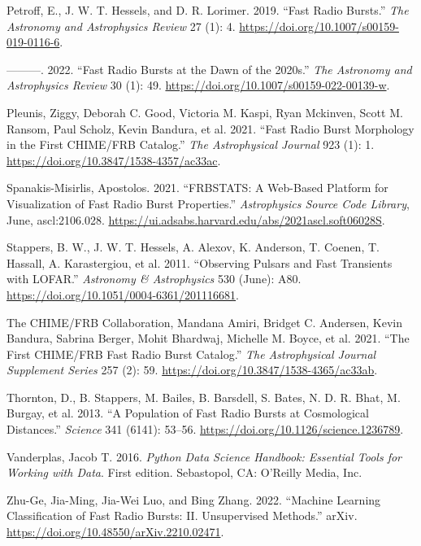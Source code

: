 \documentclass[
  letterpaper,
  DIV=11,
  numbers=noendperiod]{scrreport}
\newlength{\cslhangindent}
\newlength{\cslentryspacingunit} %
\newenvironment{CSLReferences}[2] %
 {%
  \setlength{\parindent}{0pt}
  \ifodd #1
  \let\oldpar\par
  \def\par{\hangindent=\cslhangindent\oldpar}
  \fi
  \setlength{\parskip}{#2\cslentryspacingunit}
 }%
 {}
\begin{document}
\begin{CSLReferences}{1}{0}
\leavevmode{}%
Petroff, E., J. W. T. Hessels, and D. R. Lorimer. 2019. {``Fast Radio
Bursts.''} \emph{The Astronomy and Astrophysics Review} 27 (1): 4.
\url{https://doi.org/10.1007/s00159-019-0116-6}.

\leavevmode{}%
---------. 2022. {``Fast Radio Bursts at the Dawn of the 2020s.''}
\emph{The Astronomy and Astrophysics Review} 30 (1): 49.
\url{https://doi.org/10.1007/s00159-022-00139-w}.

\leavevmode{}%
Pleunis, Ziggy, Deborah C. Good, Victoria M. Kaspi, Ryan Mckinven, Scott
M. Ransom, Paul Scholz, Kevin Bandura, et al. 2021. {``Fast {Radio Burst
Morphology} in the {First CHIME}/{FRB Catalog}.''} \emph{The
Astrophysical Journal} 923 (1): 1.
\url{https://doi.org/10.3847/1538-4357/ac33ac}.

\leavevmode{}%
Spanakis-Misirlis, Apostolos. 2021. {``{FRBSTATS}: {A} Web-Based
Platform for Visualization of Fast Radio Burst Properties.''}
\emph{Astrophysics Source Code Library}, June, ascl:2106.028.
\url{https://ui.adsabs.harvard.edu/abs/2021ascl.soft06028S}.

\leavevmode{}%
Stappers, B. W., J. W. T. Hessels, A. Alexov, K. Anderson, T. Coenen, T.
Hassall, A. Karastergiou, et al. 2011. {``Observing Pulsars and Fast
Transients with {LOFAR}.''} \emph{Astronomy \& Astrophysics} 530 (June):
A80. \url{https://doi.org/10.1051/0004-6361/201116681}.

\leavevmode{}%
The CHIME/FRB Collaboration, Mandana Amiri, Bridget C. Andersen, Kevin
Bandura, Sabrina Berger, Mohit Bhardwaj, Michelle M. Boyce, et al. 2021.
{``The {First CHIME}/{FRB Fast Radio Burst Catalog}.''} \emph{The
Astrophysical Journal Supplement Series} 257 (2): 59.
\url{https://doi.org/10.3847/1538-4365/ac33ab}.

\leavevmode{}%
Thornton, D., B. Stappers, M. Bailes, B. Barsdell, S. Bates, N. D. R.
Bhat, M. Burgay, et al. 2013. {``A {Population} of {Fast} {Radio}
{Bursts} at {Cosmological} {Distances}.''} \emph{Science} 341 (6141):
53--56. \url{https://doi.org/10.1126/science.1236789}.

\leavevmode{}%
Vanderplas, Jacob T. 2016. \emph{Python Data Science Handbook: Essential
Tools for Working with Data}. First edition. {Sebastopol, CA}: {O'Reilly
Media, Inc}.

\leavevmode{}%
Zhu-Ge, Jia-Ming, Jia-Wei Luo, and Bing Zhang. 2022. {``Machine
{Learning Classification} of {Fast Radio Bursts}: {II}. {Unsupervised
Methods}.''} {arXiv}. \url{https://doi.org/10.48550/arXiv.2210.02471}.

\end{CSLReferences}
\end{document}
